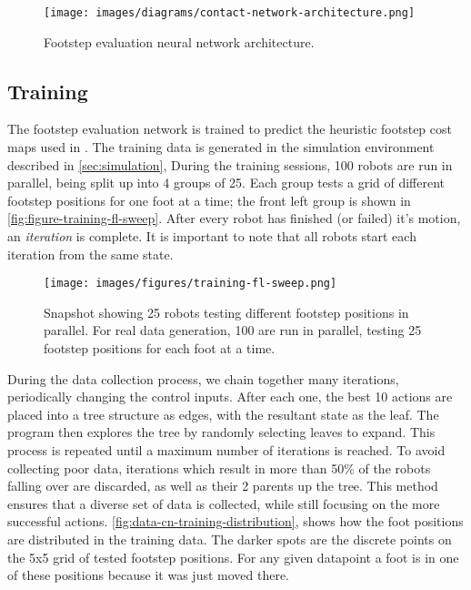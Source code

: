 \begin{figure}[H]
  \centering
  \texttt{[image: images/diagrams/contact-network-architecture.png]}
  \caption{Footstep evaluation neural network architecture.}
  \label{fig:diagram-contactnet-architecture}
\end{figure}


\subsection{Training}

The footstep evaluation network is trained to predict the heuristic
footstep cost maps used in \cite{bratta_contactnet_2024}. The training
data is generated in the simulation environment described in
\autoref{sec:simulation},
During the training sessions, 100 robots are run in parallel, being split
up into 4 groups of 25. Each group tests a grid of different footstep
positions for one foot at a time; the front left group is shown in
\autoref{fig:figure-training-fl-sweep}.
After every robot has finished (or failed) it's motion, an
\textit{iteration} is complete.
It is important to note that all robots start each iteration from the
same state.

\begin{figure}[H]
  \centering
  \texttt{[image: images/figures/training-fl-sweep.png]}
  \caption{Snapshot showing 25 robots testing different footstep
    positions in parallel. For real data generation, 100 are run in
  parallel, testing 25 footstep positions for each foot at a time.}
  \label{fig:figure-training-fl-sweep}
\end{figure}

During the data collection process, we chain together many
iterations, periodically
changing the control inputs. After each one,
the best 10 actions are placed into a tree structure as edges, with
the resultant
state as the leaf. The program then explores the tree by randomly selecting
leaves to expand. This process is repeated until a maximum number of
iterations is reached.
To avoid collecting poor data, iterations which result in more than
50\% of the robots falling
over are discarded, as well as their 2 parents up the tree. This
method ensures that a diverse
set of data is collected, while still focusing on the more successful
actions. \autoref{fig:data-cn-training-distribution}, shows
how the foot positions are distributed in the training data.
The darker spots are the discrete points on the 5x5 grid of tested footstep
positions. For any given datapoint a foot is in one of these
positions because it was just moved there.

